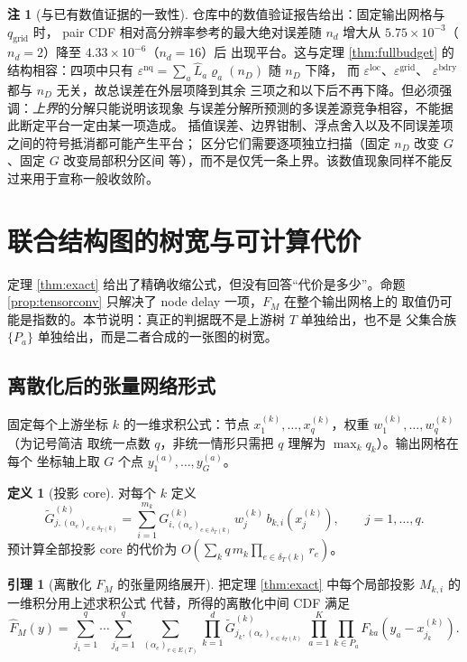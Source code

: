 \documentclass[a4paper,11pt]{article}
\theoremstyle{definition}
\newtheorem{lemma}{引理}
\newtheorem{definition}{定义}
\newtheorem{remark}{注}
\newcommand{\1}{\mathbf 1}
\begin{document}
\begin{remark}[与已有数值证据的一致性]
仓库中的数值验证报告给出：固定输出网格与 $q_{\mathrm{grid}}$ 时，
pair CDF 相对高分辨率参考的最大绝对误差随 $n_d$ 增大从
$5.75\times10^{-3}$（$n_d=2$）降至 $4.33\times10^{-6}$（$n_d=16$）后
出现平台。这与定理 \ref{thm:fullbudget} 的结构相容：四项中只有
$\varepsilon^{\mathrm{nq}}=\sum_a\widehat L_a\varrho_a(n_D)$ 随 $n_D$ 下降，
而 $\varepsilon^{\mathrm{loc}}$、$\varepsilon^{\mathrm{grid}}$、
$\varepsilon^{\mathrm{bdry}}$ 都与 $n_D$ 无关，故总误差在外层项降到其余
三项之和以下后不再下降。但必须强调：\emph{上界}的分解只能说明该现象
与误差分解所预测的多误差源竞争相容，不能据此断定平台一定由某一项造成。
插值误差、边界钳制、浮点舍入以及不同误差项之间的符号抵消都可能产生平台；
区分它们需要逐项独立扫描（固定 $n_D$ 改变 $G$、固定 $G$ 改变局部积分区间
等），而不是仅凭一条上界。该数值现象同样不能反过来用于宣称一般收敛阶。
\end{remark}

\section{联合结构图的树宽与可计算代价}
\label{sec:tw}

定理 \ref{thm:exact} 给出了精确收缩公式，但没有回答“代价是多少”。命题
\ref{prop:tensorconv} 只解决了 node delay 一项，$F_M$ 在整个输出网格上的
取值仍可能是指数的。本节说明：真正的判据既不是上游树 $T$ 单独给出，也不是
父集合族 $\{P_a\}$ 单独给出，而是二者合成的一张图的树宽。

\subsection{离散化后的张量网络形式}

固定每个上游坐标 $k$ 的一维求积公式：节点
$x^{(k)}_1,\ldots,x^{(k)}_q$，权重 $w^{(k)}_1,\ldots,w^{(k)}_q$（为记号简洁
取统一点数 $q$，非统一情形只需把 $q$ 理解为 $\max_k q_k$）。输出网格在每个
坐标轴上取 $G$ 个点 $y^{(a)}_1,\ldots,y^{(a)}_G$。

\begin{definition}[投影 core]
\label{def:projcore}
对每个 $k$ 定义
\[
\widetilde G^{(k)}_{j,(\alpha_e)_{e\in\delta_T(k)}}
=
\sum_{i=1}^{m_k}
G^{(k)}_{i,(\alpha_e)_{e\in\delta_T(k)}}
\,w^{(k)}_j\,b_{k,i}\!\left(x^{(k)}_j\right),
\qquad j=1,\ldots,q .
\]
预计算全部投影 core 的代价为
$O\!\left(\sum_k q\,m_k\prod_{e\in\delta_T(k)}r_e\right)$。
\end{definition}

\begin{lemma}[离散化 $F_M$ 的张量网络展开]
\label{lem:tnform}
把定理 \ref{thm:exact} 中每个局部投影 $M_{k,i}$ 的一维积分用上述求积公式
代替，所得的离散化中间 CDF 满足
\[
\widehat F_M(y)
=
\sum_{j_1=1}^{q}\cdots\sum_{j_d=1}^{q}
\;\sum_{(\alpha_e)_{e\in E(T)}}
\prod_{k=1}^{d}
\widetilde G^{(k)}_{j_k,(\alpha_e)_{e\in\delta_T(k)}}
\;
\prod_{a=1}^{K}\prod_{k\in P_a}
F_{ka}\!\left(y_a-x^{(k)}_{j_k}\right).
\]
\end{lemma}
\end{document}
